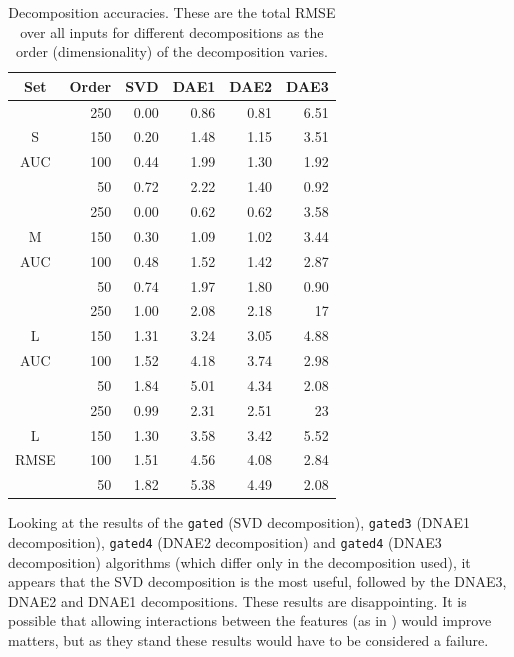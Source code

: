\documentclass{article}
\begin{document}
\begin{table}[t]
\caption{Decomposition accuracies.  These are the total RMSE over all inputs for different decompositions as the order (dimensionality) of the decomposition varies.}
\label{table:dnae-decomposition-accuracy}
\vskip 0.15in
\begin{center}
\begin{small}
\begin{sc}
\begin{tabular}{crrrrr}
\hline
\abovespace\belowspace
Set & Order & SVD & DAE1 & DAE2 & DAE3 \\
\hline
\abovespace
     & 250 & 0.00 & 0.86 & 0.81 & 6.51 \\
S    & 150 & 0.20 & 1.48 & 1.15 & 3.51 \\
AUC  & 100 & 0.44 & 1.99 & 1.30 & 1.92 \\
     &  50 & 0.72 & 2.22 & 1.40 & 0.92 \\
\abovespace
     & 250 & 0.00 & 0.62 & 0.62 & 3.58 \\
M    & 150 & 0.30 & 1.09 & 1.02 & 3.44 \\
AUC  & 100 & 0.48 & 1.52 & 1.42 & 2.87 \\
     &  50 & 0.74 & 1.97 & 1.80 & 0.90 \\
\abovespace
     & 250 & 1.00 & 2.08 & 2.18 & 17 \\
L    & 150 & 1.31 & 3.24 & 3.05 & 4.88 \\
AUC  & 100 & 1.52 & 4.18 & 3.74 & 2.98 \\
     &  50 & 1.84 & 5.01 & 4.34 & 2.08 \\
\abovespace
     & 250 & 0.99 & 2.31 & 2.51 & 23 \\
L    & 150 & 1.30 & 3.58 & 3.42 & 5.52 \\
RMSE & 100 & 1.51 & 4.56 & 4.08 & 2.84 \\
\belowspace
     &  50 & 1.82 & 5.38 & 4.49 & 2.08 \\
\hline
\end{tabular}
\end{sc}
\end{small}
\end{center}
\vskip -0.1in
\end{table}

Looking at the results of the \texttt{gated} (SVD decomposition), \texttt{gated3} (DNAE1 decomposition), \texttt{gated4} (DNAE2 decomposition) and \texttt{gated4} (DNAE3 decomposition) algorithms (which differ only in the decomposition used), it appears that the SVD decomposition is the most useful, followed by the DNAE3, DNAE2 and DNAE1 decompositions.  These results are disappointing.  It is possible that allowing interactions between the features (as in \cite{larochelle2009}) would improve matters, but as they stand these results would have to be considered a failure.
\end{document}
